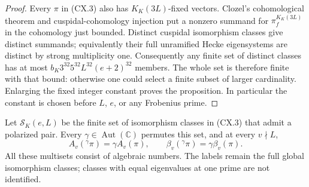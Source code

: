 \begin{proof}
Every $\pi$ in (CX.3) also has $K_K(3L)$-fixed vectors.
Clozel's cohomological theorem and cuspidal-cohomology injection
put a nonzero summand for $\pi_f^{K_K(3L)}$ in the cohomology
just bounded.  Distinct cuspidal isomorphism classes give
distinct summands; equivalently their full unramified Hecke
eigensystems are distinct by strong multiplicity one.
Consequently any finite set of distinct classes has at most
$b_K3^{32}5^{32}L^{32}(e+2)^{32}$ members.  The whole set is
therefore finite with that bound: otherwise one could select a
finite subset of larger cardinality.  Enlarging the fixed
integer constant proves the proposition.  In particular the
constant is chosen before $L$, $e$, or any Frobenius prime.
\end{proof}

\begin{proposition}
\label{claim:CX2}
Let $\mathcal S_K(e,L)$ be the finite set of isomorphism classes
in (CX.3) that admit a polarized pair.  Every
$\gamma\in\operatorname{Aut}(\mathbb C)$ permutes this set, and
at every $v\nmid L$,
\[
 A_v({}^{\gamma}\pi)=\gamma A_v(\pi),\qquad
 \beta_v({}^{\gamma}\pi)=\gamma\beta_v(\pi).
                                                               \tag{CX.8}
\]
All these multisets consist of algebraic numbers.  The labels
remain the full global isomorphism classes; classes with equal
eigenvalues at one prime are not identified.
\end{proposition}

